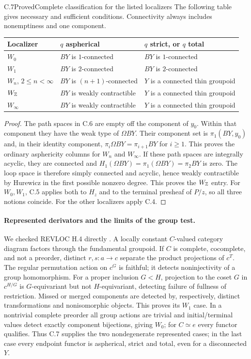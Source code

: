 \begin{claim}{C.7}{Proved}{Complete classification for the listed localizers}
\label{C:classification}
The following table gives necessary and sufficient conditions.
Connectivity always includes nonemptiness and one component.
\begin{center}
\begin{tabular}{lll}
\hline
Localizer & $q$ aspherical & $q$ strict, or $q$ total\\
\hline
$W_0$ & $BY$ is $1$-connected & $BY$ is $1$-connected\\
$W_1$ & $BY$ is $2$-connected & $BY$ is $2$-connected\\
$W_n$, $2\leq n<\infty$ & $BY$ is $(n+1)$-connected
  & $Y$ is a connected thin groupoid\\
$W_{\mathbb Z}$ & $BY$ is weakly contractible
  & $Y$ is a connected thin groupoid\\
$W_\infty$ & $BY$ is weakly contractible
  & $Y$ is a connected thin groupoid\\
\hline
\end{tabular}
\end{center}
\end{claim}
\begin{proof}
The path spaces in C.6 are empty off the component of $y_0$.
Within that component they have the weak type of $\Omega BY$.
Their component set is $\pi_1(BY,y_0)$ and, in their identity
component, $\pi_i\Omega BY=\pi_{i+1}BY$ for $i\geq1$.
This proves the ordinary asphericity columns for $W_n$ and
$W_\infty$. If these path spaces are integrally acyclic, they
are connected and $H_1(\Omega BY)=\pi_1(\Omega BY)=\pi_2BY$
is zero. The loop space is therefore simply connected and
acyclic, hence weakly contractible by Hurewicz in the first
possible nonzero degree. This proves the $W_{\mathbb Z}$ entry.
For $W_0,W_1$, C.5 applies both to $H_z$ and to the terminal
presheaf of $P/z$, so all three notions coincide. For the other
localizers apply C.4.
\end{proof}

\paragraph{Represented derivators and the limits of the group test.}
We checked REVLOC H.4 directly \cite{FREVLOCH}. A locally constant $C$-valued
category diagram factors through the fundamental groupoid.
If $C$ is complete, cocomplete, and not a preorder, distinct
$r,s:a\to c$ separate the product projections of $c^T$.
The regular permutation action on $c^G$ is faithful; it detects
noninjectivity of a group homomorphism. For a proper inclusion
$G<H$, projection to the coset $G$ in $c^{H/G}$ is $G$-equivariant
but not $H$-equivariant, detecting failure of fullness of
restriction. Missed or merged components are detected by,
respectively, distinct transformations and nonisomorphic objects.
This proves its $W_1$ case. In a nontrivial complete preorder all
group actions are trivial and initial/terminal values detect
exactly component bijections, giving $W_0$; for $C\simeq e$
every functor qualifies. Thus C.7 supplies the two nondegenerate
represented cases; in the last case every endpoint functor is
aspherical, strict and total, even for a disconnected $Y$.

